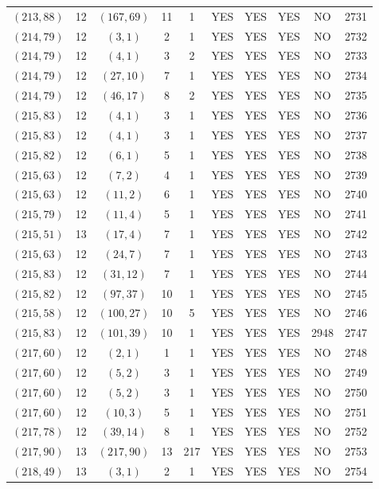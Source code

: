 \begin{longtable}{|c|c|c|c|c|c|c|c|c|c|}
$(213, 88)$ & 12 & $(167, 69)$ & 11 & 1 & YES & YES & YES & NO & 2731\\
$(214, 79)$ & 12 & $(3, 1)$ & 2 & 1 & YES & YES & YES & NO & 2732\\
$(214, 79)$ & 12 & $(4, 1)$ & 3 & 2 & YES & YES & YES & NO & 2733\\
$(214, 79)$ & 12 & $(27, 10)$ & 7 & 1 & YES & YES & YES & NO & 2734\\
$(214, 79)$ & 12 & $(46, 17)$ & 8 & 2 & YES & YES & YES & NO & 2735\\
$(215, 83)$ & 12 & $(4, 1)$ & 3 & 1 & YES & YES & YES & NO & 2736\\
$(215, 83)$ & 12 & $(4, 1)$ & 3 & 1 & YES & YES & YES & NO & 2737\\
$(215, 82)$ & 12 & $(6, 1)$ & 5 & 1 & YES & YES & YES & NO & 2738\\
$(215, 63)$ & 12 & $(7, 2)$ & 4 & 1 & YES & YES & YES & NO & 2739\\
$(215, 63)$ & 12 & $(11, 2)$ & 6 & 1 & YES & YES & YES & NO & 2740\\
$(215, 79)$ & 12 & $(11, 4)$ & 5 & 1 & YES & YES & YES & NO & 2741\\
$(215, 51)$ & 13 & $(17, 4)$ & 7 & 1 & YES & YES & YES & NO & 2742\\
$(215, 63)$ & 12 & $(24, 7)$ & 7 & 1 & YES & YES & YES & NO & 2743\\
$(215, 83)$ & 12 & $(31, 12)$ & 7 & 1 & YES & YES & YES & NO & 2744\\
$(215, 82)$ & 12 & $(97, 37)$ & 10 & 1 & YES & YES & YES & NO & 2745\\
$(215, 58)$ & 12 & $(100, 27)$ & 10 & 5 & YES & YES & YES & NO & 2746\\
$(215, 83)$ & 12 & $(101, 39)$ & 10 & 1 & YES & YES & YES & 2948 & 2747\\
$(217, 60)$ & 12 & $(2, 1)$ & 1 & 1 & YES & YES & YES & NO & 2748\\
$(217, 60)$ & 12 & $(5, 2)$ & 3 & 1 & YES & YES & YES & NO & 2749\\
$(217, 60)$ & 12 & $(5, 2)$ & 3 & 1 & YES & YES & YES & NO & 2750\\
$(217, 60)$ & 12 & $(10, 3)$ & 5 & 1 & YES & YES & YES & NO & 2751\\
$(217, 78)$ & 12 & $(39, 14)$ & 8 & 1 & YES & YES & YES & NO & 2752\\
$(217, 90)$ & 13 & $(217, 90)$ & 13 & 217 & YES & YES & YES & NO & 2753\\
$(218, 49)$ & 13 & $(3, 1)$ & 2 & 1 & YES & YES & YES & NO & 2754\\

\end{longtable}
